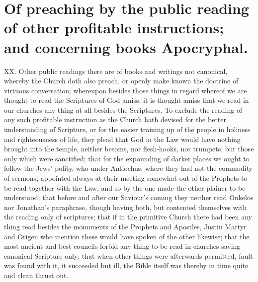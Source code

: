 \section*{Of preaching by the public reading of other profitable instructions; and concerning books Apocryphal.}
XX. Other public readings there are of books and writings not canonical, whereby the Church doth also preach, or openly  make known the doctrine of virtuous conversation; whereupon besides those things in regard whereof we are thought to read the Scriptures of God amiss, it is thought amiss that we read in our churches any thing at all besides the Scriptures.
 To exclude the reading of any such profitable instruction as the Church hath devised for the better understanding of Scripture, or for the easier training up of the people in holiness and righteousness of life,
 they plead that God in the Law would have nothing brought into the temple, neither besoms, nor flesh-hooks, nor trumpets, but those only which were sanctified; that for the expounding of darker places we ought to follow the Jews’ polity, who under Antiochus, where they  had not the commodity of sermons, appointed always at their meeting somewhat out of the Prophets to be read together with the Law,
 and so by the one made the other plainer to be understood; that before and after our Saviour’s coming they neither read Onkelos nor Jonathan’s paraphrase, though having both, but contented themselves with the reading only of scriptures; that if in the primitive Church there had been any thing read besides the monuments of the Prophets and Apostles, Justin Martyr and Origen who mention these would have spoken of the other likewise; that the most ancient and best councils forbid any thing to be read in churches saving canonical Scripture only; that when other things were afterwards permitted, fault was found with it, it succeeded but ill, the Bible itself was thereby in time quite and clean thrust out.

